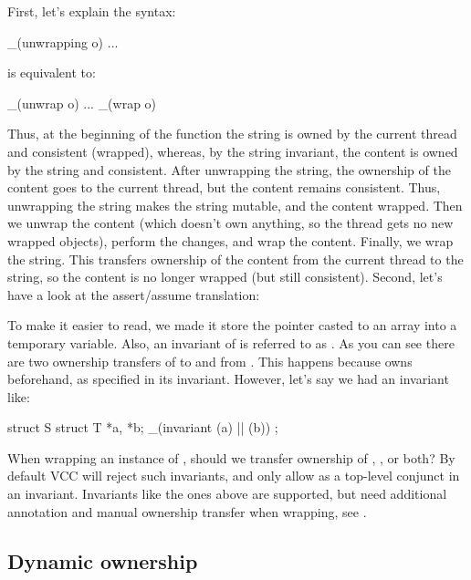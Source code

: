 
\noindent
First, let's explain the syntax:
\begin{VCC}
_(unwrapping o) { ... }
\end{VCC}
is equivalent to:
\begin{VCC}
_(unwrap o) { ... } _(wrap o)
\end{VCC}
Thus, at the beginning of the function the string is owned by the current thread and consistent (\ie wrapped),
whereas, by the string invariant, the content is owned by the string and consistent.
After unwrapping the string, the ownership of the content goes to the current thread,
but the content remains consistent.
Thus, unwrapping the string makes the string mutable, and the content wrapped.
Then we unwrap the content (which doesn't own anything, so the thread gets no new wrapped objects), perform the changes,
and wrap the content.
Finally, we wrap the string.
This transfers ownership of the content from the current thread to the string, so the content is no longer wrapped (but still consistent).
Second, let's have a look at the assert\slash assume translation:


\noindent
To make it easier to read, we made it store the  pointer
casted to an array into a temporary variable.
Also, an invariant of  is referred to as .
As you can see there are two ownership transfers
of  to and from \vcc{\me}.
This happens because  owns  beforehand,
as specified in its invariant.
However, let's say we had an invariant like:
\begin{VCC}
struct S {
  struct T *a, *b;
  _(invariant \mine(a) || \mine(b))
};
\end{VCC}
When wrapping an instance of , should we transfer ownership of , , or both?
By default VCC will reject such invariants, and only allow 
as a top-level conjunct in an invariant.
Invariants like the ones above are supported, but need additional annotation
and manual ownership transfer when wrapping, see .



\subsection{Dynamic ownership}
\label{sect:dynamic-ownership}

